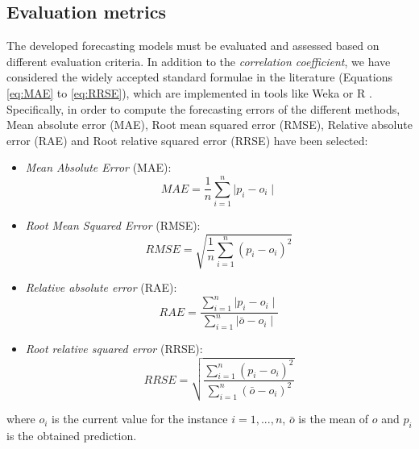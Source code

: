 \documentclass[a4paper,10pt,twocolumn,preprint,3p]{elsarticle}
\begin{document}

\subsection{Evaluation metrics}
\label{subsec:evaluation_metrics}

The developed forecasting models must be evaluated and assessed based on different evaluation criteria. In addition to the \textit{correlation coefficient}, we have considered the widely accepted standard formulae in the literature \cite{gepsoft} (Equations \ref{eq:MAE} to \ref{eq:RRSE}), which are implemented in tools like Weka \cite{pentaho,Witten2011} or R \cite{otexts,Hyndman2013}.
Specifically, in order to compute the forecasting errors of the different methods, Mean absolute error (MAE), Root mean squared error (RMSE), Relative absolute error (RAE) and Root relative squared error (RRSE) have been selected:

\begin{itemize}
  \item \emph{Mean Absolute Error} (MAE):
        \begin{equation}\label{eq:MAE}
            MAE = \frac{1}{n}\sum_{i=1}^n {\mid p_i - o_i\mid}
        \end{equation}

  \item \emph{Root Mean Squared Error} (RMSE):
        \begin{equation}\label{eq:RMSE}
            RMSE = \sqrt{ \frac{1}{n}\sum_{i=1}^n {(p_i - o_i)}^2 }
        \end{equation}

  \item \emph{Relative absolute error} (RAE):
        \begin{equation}\label{eq:RAE}
            RAE = \frac{ \sum_{i=1}^n {\mid p_i - o_i\mid} }{ \sum_{i=1}^n {\mid \bar{o} - o_i\mid} }
        \end{equation}

  \item \emph{Root relative squared error} (RRSE):
        \begin{equation}\label{eq:RRSE}
            RRSE = \sqrt{ \frac{ \sum_{i=1}^n {(p_i - o_i)}^2  }{ \sum_{i=1}^n {(\bar{o} - o_i)}^2 }  }
        \end{equation}
\end{itemize}
where $o_i$ is the current value for the instance $i = {1,...,n}$, $\bar{o}$ is the mean of $o$ and $p_i$ is the obtained prediction.
\end{document}
